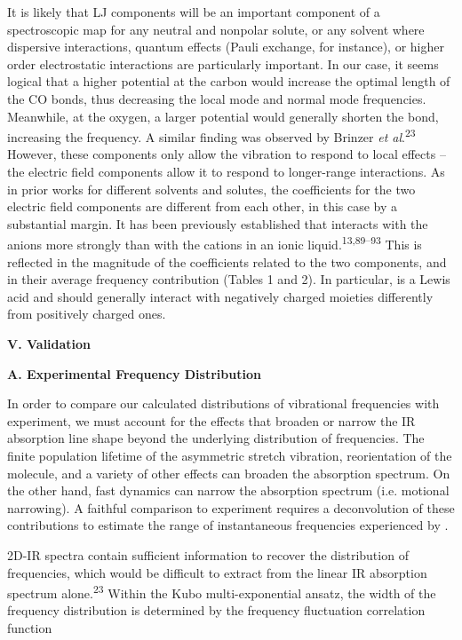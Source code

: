 \documentclass[]{article}
\begin{document}
It is likely that LJ components will be an important component of a spectroscopic map for any neutral and nonpolar solute, or any solvent where dispersive interactions, quantum effects (Pauli exchange, for instance), or higher order electrostatic interactions are particularly important. In our case, it seems logical that a higher potential at the carbon would increase the optimal length of the CO bonds, thus decreasing the local mode and normal mode frequencies. Meanwhile, at the oxygen, a larger potential would generally shorten the bond, increasing the frequency. A similar finding was observed by Brinzer \emph{et al}.\textsuperscript{23} However, these components only allow the  vibration to respond to local effects -- the electric field components allow it to respond to longer-range interactions. As in prior works for different solvents and solutes, the coefficients for the two electric field components are different from each other, in this case by a substantial margin. It has been previously established that  interacts with the anions more strongly than with the cations in an ionic liquid.\textsuperscript{13,89--93} This is reflected in the magnitude of the coefficients related to the two components, and in their average frequency contribution (Tables 1 and 2). In particular,  is a Lewis acid and should generally interact with negatively charged moieties differently from positively charged ones.

\textbf{V. Validation }

\textbf{A. Experimental Frequency Distribution }

In order to compare our calculated distributions of  vibrational frequencies with experiment, we must account for the effects that broaden or narrow the IR absorption line shape beyond the underlying distribution of frequencies. The finite population lifetime of the asymmetric stretch vibration, reorientation of the  molecule, and a variety of other effects can broaden the absorption spectrum. On the other hand, fast dynamics can narrow the absorption spectrum (i.e. motional narrowing). A faithful comparison to experiment requires a deconvolution of these contributions to estimate the range of instantaneous frequencies experienced by .

2D-IR spectra contain sufficient information to recover the distribution of frequencies, which would be difficult to extract from the linear IR absorption spectrum alone.\textsuperscript{23} Within the Kubo multi-exponential ansatz, the width of the frequency distribution is determined by the frequency fluctuation correlation function
\end{document}
